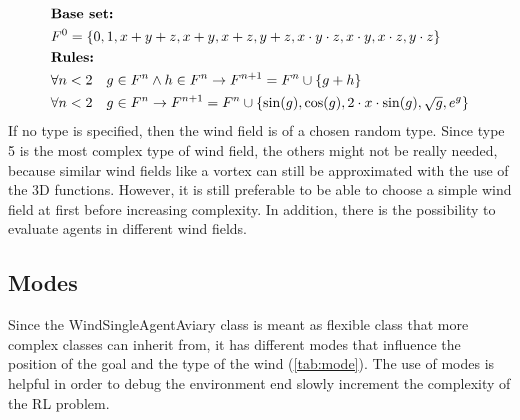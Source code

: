 \newpage
\begin{align}
	&\textbf{Base set:} \notag \\
	&F^0 = \{0, 1, x + y + z, x + y, x + z, y + z, 
	x \cdot y \cdot z, x \cdot y, x \cdot z, y \cdot z\} \label{eq:base}\\
	&\textbf{Rules:} \notag \\
	&\forall n < 2 \quad g \in F^n \land h \in F^n \rightarrow F^{n+1} = F^n \cup \{ 
	 g + h\} \label{eq:rule0}\\
	&\forall n < 2 \quad g \in F^n \rightarrow F^{n+1} = F^n \cup \{ \sin(g), \cos(g), 2 \cdot x \cdot \sin(g), \sqrt{g}, e^g\} \label{eq:rule1}
\end{align}
\newline
If no type is specified, then the wind field is of a chosen random type.
Since type 5 is the most complex type of wind field, the others might not be really needed, 
because similar wind fields like a vortex can still be approximated with the use of the 3D functions. 
However, it is still preferable to be able to choose a simple wind field at first before increasing complexity. 
In addition, there is the possibility to evaluate agents in different wind fields.

\subsection{Modes}\label{sec:modes}
Since the WindSingleAgentAviary class is meant as flexible class that more complex classes can inherit from, 
it has different modes that influence the position of the goal and the type of the wind (\cref{tab:mode}).
The use of modes is helpful in order to debug the environment end slowly increment the complexity of the RL problem.

